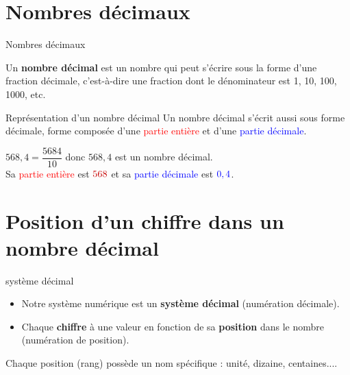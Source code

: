 \begin{pageCours} 

\section{Nombres décimaux}


\begin{DefT}{Nombres décimaux}

Un \textbf{nombre décimal} est un nombre qui peut s'écrire sous la forme d'une fraction décimale, c'est-à-dire une fraction dont le dénominateur est 1, 10, 100, 1000, etc. 

\end{DefT}


\begin{DefT}{Représentation d'un nombre décimal}
Un nombre décimal s'écrit aussi sous forme décimale, forme composée d'une \textcolor{red}{partie entière} et d'une \textcolor{blue}{partie décimale}.
\end{DefT}

\begin{Rep}
$568,4 = \dfrac{5684}{10}$ donc $568,4$ est un nombre décimal.\\ 
Sa \textcolor{red}{partie entière} est $\textcolor{red}{568}$ et sa \textcolor{blue}{partie décimale} est $\textcolor{blue}{0,4}$.


\end{Rep}






\section{Position d'un chiffre dans un nombre décimal}

\begin{DefT}{système décimal}
\begin{itemize}
\item Notre système numérique est un \textbf{système décimal} (numération décimale).
\item Chaque \textbf{chiffre} à une valeur en fonction de sa \textbf{position} dans le nombre (numération de position).
\end{itemize}
\end{DefT}


Chaque position (rang) possède un nom spécifique : unité, dizaine, centaines....


\end{pageCours}
